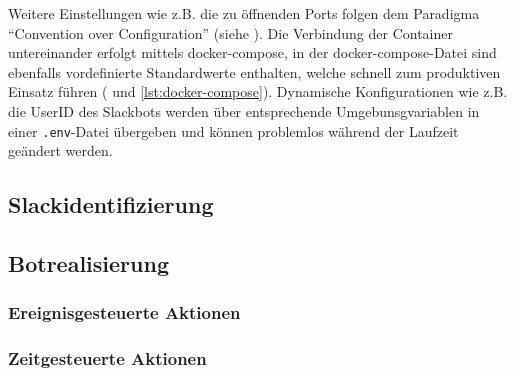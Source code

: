 Weitere Einstellungen wie z.B. die zu öffnenden Ports folgen dem Paradigma \enquote{Convention over Configuration} (siehe \cite{NicholasChenConventionConfiguration2006}). Die Verbindung der Container untereinander erfolgt mittels docker-compose, in der docker-compose-Datei sind ebenfalls vordefinierte Standardwerte enthalten, welche schnell zum produktiven Einsatz führen (\cite{DockerCompose2018} und \autoref{lst:docker-compose}).
Dynamische Konfigurationen wie z.B. die UserID des Slackbots werden über entsprechende Umgebunsgvariablen in einer \verb+.env+-Datei übergeben und können problemlos während der Laufzeit geändert werden.





\subsection{Slackidentifizierung}


\subsection{Botrealisierung}
\subsubsection{Ereignisgesteuerte Aktionen}
\subsubsection{Zeitgesteuerte Aktionen}





